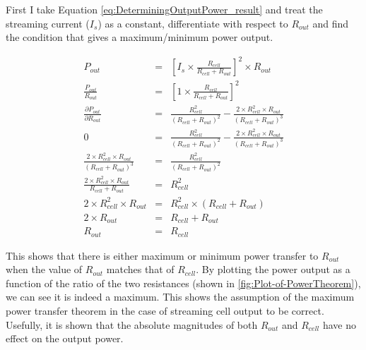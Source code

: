 First I take Equation \ref{eq:DeterminingOutputPower_result} and treat the streaming current ($I_{s}$) as a constant, differentiate with respect to $R_{out}$ and find the condition that gives a maximum/minimum power output.

\begin{eqnarray}
    P_{out} & = & \left[I_{s}\times\frac{R_{cell}}{R_{cell}+R_{out}}\right]^{2}\times R_{out}\nonumber\\
    \frac{P_{out}}{R_{out}} & = & \left[1\times\frac{R_{cell}}{R_{cell}+R_{out}}\right]^{2}\nonumber\\
    \frac{\partial P_{out}}{\partial R_{out}} & = & \frac{R_{cell}^{2}}{(R_{cell}+R_{out})^{2}}-\frac{2\times R_{cell}^{2}\times R_{out}}{(R_{cell}+R_{out})^{3}}\nonumber\\
    0 & = & \frac{R_{cell}^{2}}{(R_{cell}+R_{out})^{2}}-\frac{2\times R_{cell}^{2}\times R_{out}}{(R_{cell}+R_{out})^{3}}\nonumber\\
    \frac{2\times R_{cell}^{2}\times R_{out}}{(R_{cell}+R_{out})^{3}} & = & \frac{R_{cell}^{2}}{(R_{cell}+R_{out})^{2}}\nonumber\\
    \frac{2\times R_{cell}^{2}\times R_{out}}{R_{cell}+R_{out}} & = & R_{cell}^{2}\nonumber\\
    2\times R_{cell}^{2}\times R_{out} & = & R_{cell}^{2}\times(R_{cell}+R_{out})\nonumber\\
    2\times R_{out} & = & R_{cell}+R_{out}\nonumber\\
    R_{out} & = & R_{cell}
    \label{eq:maximumPowerTheorem_norton}
\end{eqnarray}

This shows that there is either maximum or minimum power transfer to $R_{out}$ when the value of $R_{out}$ matches that of $R_{cell}$.
By plotting the power output as a function of the ratio of the two resistances (shown in \cref{fig:Plot-of-PowerTheorem}), we can see it is indeed a maximum.
This shows the assumption of the maximum power transfer theorem in the case of streaming cell output to be correct.
Usefully, it is shown that the absolute magnitudes of both $R_{out}$ and $R_{cell}$ have no effect on the output power.

